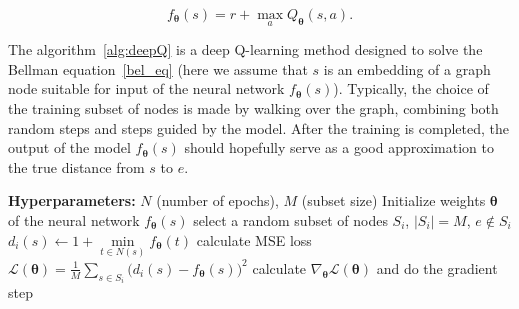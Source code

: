 \documentclass[reqno,11pt]{amsart}
\begin{document}
$$
    f_{\boldsymbol \theta}(s) = r + \max_a Q_{\boldsymbol \theta}(s, a).
$$

The algorithm~\ref{alg:deepQ} is a deep Q-learning method designed to solve the Bellman equation~\ref{bel_eq} (here we assume that $s$ is an embedding of a graph node suitable for input of the neural network $f_{\boldsymbol \theta}(s)$). Typically, the choice of the training subset of nodes is made by walking over the graph, combining both random steps and steps guided by the model. After the training is completed, the output of the model $f_{\boldsymbol \theta}(s)$ should hopefully serve as a good approximation to the true distance from $s$ to $e$.

\begin{algorithm}[t]
 \caption{Deep Q-learning}
 \label{alg:deepQ}
 \begin{algorithmic}[1]
 \STATE \textbf{Hyperparameters:} $N$ (number of epochs), $M$ (subset size)
 \STATE Initialize weights $\boldsymbol \theta$ of the neural network $f_{\boldsymbol \theta}(s)$
 \STATE select a random subset of nodes $S_i$, $|S_i| = M$, $e\notin S_i$
 \STATE 
 $d_i(s) \leftarrow  1 + \min\limits_{t \in N(s)}f_{\boldsymbol \theta}(t)$
 \ENDFOR
 \STATE calculate MSE loss $\mathcal L(\boldsymbol \theta) = \frac 1M \sum\limits_{s\in S_i}\big(d_i(s) - f_{\boldsymbol \theta}(s)\big)^2$
 \STATE calculate $\nabla_{\boldsymbol \theta} \mathcal L(\boldsymbol \theta)$ and do the gradient step
 \ENDFOR
 \end{algorithmic}

 \end{algorithm}
\end{document}

